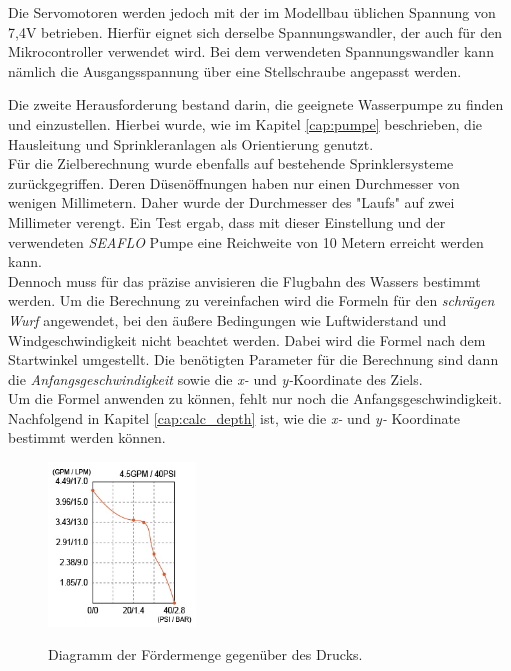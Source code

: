 Die Servomotoren werden jedoch mit der im Modellbau üblichen Spannung von 7,4V betrieben. Hierfür eignet sich derselbe Spannungswandler, der auch für den Mikrocontroller verwendet wird. Bei dem verwendeten Spannungswandler kann nämlich die Ausgangsspannung über eine Stellschraube angepasst werden.

Die zweite Herausforderung bestand darin, die geeignete Wasserpumpe zu finden und einzustellen. Hierbei wurde, wie im Kapitel \ref{cap:pumpe} beschrieben, die Hausleitung und Sprinkleranlagen als Orientierung genutzt.
\\
Für die Zielberechnung wurde ebenfalls auf bestehende Sprinklersysteme zurückgegriffen. Deren Düsenöffnungen haben nur einen Durchmesser von wenigen Millimetern. Daher wurde der Durchmesser des "Laufs" auf zwei Millimeter verengt. Ein Test ergab, dass mit dieser Einstellung und der verwendeten \textit{SEAFLO} Pumpe eine Reichweite von 10 Metern erreicht werden kann.
\\
Dennoch muss für das präzise anvisieren die Flugbahn des Wassers bestimmt werden. Um die Berechnung zu vereinfachen wird die Formeln für den \textit{schrägen Wurf} angewendet, bei den äußere Bedingungen wie Luftwiderstand und Windgeschwindigkeit nicht beachtet werden. Dabei wird die Formel nach dem Startwinkel umgestellt. Die benötigten Parameter für die Berechnung sind dann die \textit{Anfangsgeschwindigkeit} sowie die \textit{x-} und \textit{y-}Koordinate des Ziels.
\\
Um die Formel anwenden zu können, fehlt nur noch die Anfangsgeschwindigkeit. Nachfolgend in Kapitel \ref{cap:calc_depth} ist, wie die \textit{x-} und \textit{y-} Koordinate bestimmt werden können.
\\
\begin{figure}
    \centering
    \includegraphics[width=0.35\textwidth]{images/seaflo_lpm_psi.png}
    \label{fig:psi_seaflo}
    \caption{Diagramm der Fördermenge gegenüber des Drucks. \cite{seaflo_pump}}
\end{figure}
